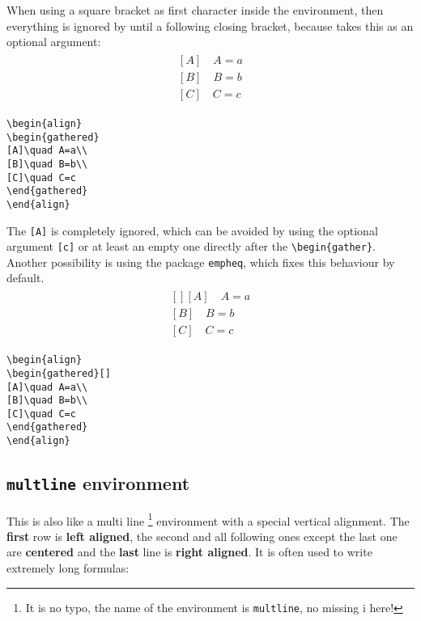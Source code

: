 \begin{table}[htb]
When using a square bracket as first character inside the environment, then 
everything is ignored by \AmS until a following closing bracket, because \AmS takes this
as an optional argument:
%
\begin{align}
\begin{gathered}
[A]\quad A=a\\
[B]\quad B=b\\
[C]\quad C=c
\end{gathered}
\end{align}
%
\begin{lstlisting}
\begin{align}
\begin{gathered}
[A]\quad A=a\\
[B]\quad B=b\\
[C]\quad C=c
\end{gathered}
\end{align}
\end{lstlisting}
%
The \verb+[A]+ is completely ignored, which can be avoided by using the
optional argument \verb+[c]+ or at least an empty one directly
after the \verb+\begin{gather}+. Another possibility is using the package \verb+empheq+,
which fixes this behaviour by default.
%
\begin{align}
\begin{gathered}[]
[A]\quad A=a\\
[B]\quad B=b\\
[C]\quad C=c
\end{gathered}
\end{align}
%
\begin{lstlisting}
\begin{align}
\begin{gathered}[]
[A]\quad A=a\\
[B]\quad B=b\\
[C]\quad C=c
\end{gathered}
\end{align}
\end{lstlisting}
%


\subsection{\texttt{multline} environment}
This is also like a multi line%
\footnote{It is no typo, the name of the environment is \texttt{multline}, no
missing i here!} environment with a special vertical alignment. The \textbf{first}
row is \textbf{left aligned}, the second and all following ones except
the last one are \textbf{centered} and the \textbf{last} line is \textbf{right
aligned}. It is often used to write extremely long formulas:



\end{table}
